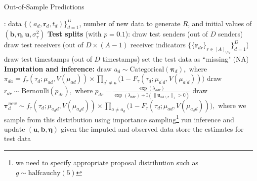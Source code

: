 \documentclass[ba]{imsart}
\def\spacingset#1{\renewcommand{\baselinestretch}%
	{#1}\small\normalsize} \spacingset{1}
\numberwithin{equation}{section}
\theoremstyle{plain}
\begin{document}
	\begin{algorithm}[!t]
		\spacingset{1}
		\caption{Out-of-Sample Predictions}
		\label{alg:PPE}
		\begin{algorithmic}
			: data $ \{ (a_d, \boldsymbol{r}_d, t_d)\}_{d=1}^D$, 
			number of new data to generate $R$, and initial values of $(\boldsymbol{b}, \boldsymbol{\eta}, \boldsymbol{u}, \sigma^2_\tau)$
			\vskip 0.1in
			\textbf{Test splits} (with $p=0.1$):	
			\STATE draw test senders (out of $D$ senders) 
			\STATE draw test receivers (out of $D\times (A-1)$ receiver indicators $\{\{\boldsymbol{r}_{dr}\}_{r\in [A]_{\backslash a_d}}\}_{d=1}^D$)
			\STATE draw test timestamps  (out of $D$ timestamps) 
			\STATE set the test data as ``missing" (NA)
			\vskip 0.1in
			\textbf{Imputation and inference:}	
			\STATE draw $a_d \sim \mbox{Categorical}(\boldsymbol{\pi}_d),$ where $\pi_{da}=f_{\tau}(\tau_{d}; \mu_{ad}, V(\mu_{ad}))\times \prod_{a^\prime\neq a}\big(1-F_{\tau}(\tau_{d}; \mu_{a^\prime d}, V(\mu_{a^\prime d})) \big)$ 
			\ENDIF
			\STATE draw $r_{dr} \sim \mbox{Bernoulli}(p_{dr}),$
			where $p_{dr}=\frac{\exp(\lambda_{adr})}{\exp(\lambda_{adr})+\text{I}(\lVert\boldsymbol{u}_{ad\backslash r}\rVert_1 > 0 )}$ %
			\ENDIF
			\ENDFOR
			\STATE draw $\boldsymbol{\tau}^{new}_d \sim f_{\tau}(\tau_{d}; \mu_{a_d d}, V(\mu_{a_d d}))\times \prod_{a\neq a_d}\big(1-F_{\tau}(\tau_{d}; \mu_{a d}, V(\mu_{a_d d})) \big),$ %
			where we sample from this distribution using importance sampling\footnote{we need to specify appropriate proposal distribution such as $g \sim \mbox{halfcauchy}(5)$}
			\ENDIF
			\STATE run inference and update $(\boldsymbol{u},\boldsymbol{b}, \boldsymbol{\eta})$ given the imputed and observed data
			\ENDFOR
			\STATE store the estimates for test data
			\ENDFOR
		\end{algorithmic}
	\end{algorithm}
	
\end{document}
